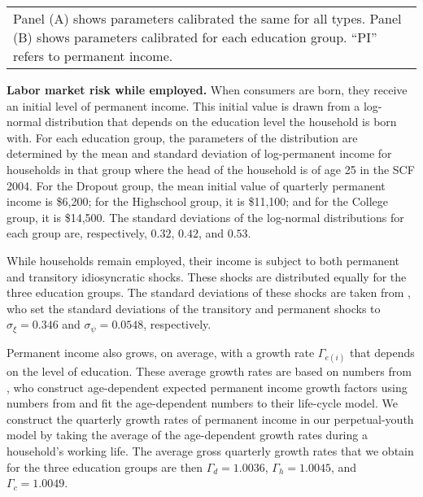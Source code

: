 \documentclass[\econtexRoot/HAFiscal]{subfiles}
\begin{document}
{\begin{table}[p]
\begin{tabular}{c}
      \end{tabular}
    \begin{tabular}{p{16cm}}
      \medskip
      \small Panel (A) shows parameters calibrated the same for all types. Panel (B) shows parameters calibrated for each education group. ``PI'' refers to permanent income.
      \end{tabular}
    \notinsubfile{\label{tab:calibration}}
  \end{table}
  \clearpage
}

\textbf{Labor market risk while employed.} When consumers are born, they receive an initial level of permanent income.
This initial value is drawn from a log-normal distribution that depends on the education level the household is born with.
For each education group, the parameters of the distribution are determined by the mean and standard deviation of log-permanent income for households in that group where the head of the household is of age 25 in the SCF 2004.
For the Dropout group, the mean initial value of quarterly permanent income is \$6,200; for the Highschool group, it is \$11,100; and for the College group, it is \$14,500.
The standard deviations of the log-normal distributions for each group are, respectively, $0.32$, $0.42$, and $0.53$.


While households remain employed, their income is subject to both permanent and transitory idiosyncratic shocks.
These shocks are distributed equally for the three education groups.
The standard deviations of these shocks are taken from \cite{carroll2020sticky}, who set the standard deviations of the transitory and permanent shocks to $\sigma_\xi=0.346$ and $\sigma_\psi=0.0548$, respectively.


Permanent income also grows, on average, with a growth rate $\Gamma_{e(i)}$ that depends on the level of education.
These average growth rates are based on numbers from \cite{carroll2020modeling}, who construct age-dependent expected permanent income growth factors using numbers from \cite{cagetti2003wealth} and fit the age-dependent numbers to their life-cycle model.
We construct the quarterly growth rates of permanent income in our perpetual-youth model by taking the average of the age-dependent growth rates during a household's working life.
The average gross quarterly growth rates that we obtain for the three education groups are then $\Gamma_d=1.0036$, $\Gamma_h=1.0045$, and $\Gamma_c=1.0049$.
\end{document}
